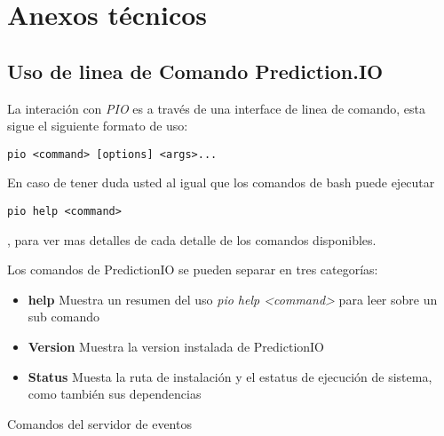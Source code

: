 \chapter{Anexos técnicos}
\label{ch:anexos}


\section{Uso de linea de Comando Prediction.IO}


La interación con \emph{PIO} es a través de una interface de linea de comando, esta sigue el siguiente formato de uso:

 

\begin{lstlisting}[frame=single,basicstyle=\ttfamily\tiny,]
  pio <command> [options] <args>...
\end{lstlisting}



En caso de tener duda usted al igual que los comandos de bash puede ejecutar

\begin{lstlisting}[frame=single,basicstyle=\ttfamily\tiny,]
pio help <command> 
\end{lstlisting}, para ver mas detalles de cada detalle de los comandos disponibles.


Los comandos de PredictionIO se pueden separar en tres categorías:

\begin{itemize}
	\item \textbf{help} Muestra un resumen del uso  \emph{pio help <command>} para leer sobre un sub comando
	
	\item \textbf{Version} Muestra la version instalada de PredictionIO
	
	
	\item \textbf{Status} Muesta la ruta de instalación y el estatus de ejecución de sistema, como también sus dependencias
	
\end{itemize}

Comandos del servidor de eventos



